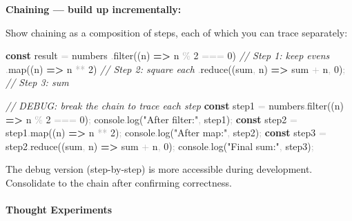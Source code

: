 \documentclass[
  justified,
  openright,
]{tufte-book}
\let\paragraph\paragraph
\newcommand{\KeywordTok}[1]{\textcolor{CodeKeyword}{\textbf{#1}}}  %
\newcommand{\StringTok}[1]{\textcolor{CodeString}{#1}}              %
\newcommand{\CommentTok}[1]{\textcolor{CodeComment}{\textit{#1}}}  %
\newcommand{\CodeNumTok}[1]{\textcolor{CodeNumber}{#1}}             %
\newcommand{\CodeFuncTok}[1]{\textcolor{CodeKeyword}{#1}}           %
\newcommand{\OperatorTok}[1]{\textcolor{DarkGray}{#1}}              %
\newenvironment{Shaded}{%
  \begin{mdframed}[style=TufteCode]%
}{%
  \end{mdframed}%
}
\let\paragraph\paragraph
\begin{document}
\textbf{Chaining --- build up incrementally:}

Show chaining as a composition of steps, each of which you can trace
separately:

\begin{Shaded}
\begin{Highlighting}[]
\KeywordTok{const} result \OperatorTok{=} numbers
  \OperatorTok{.}\CodeFuncTok{filter}((n) \KeywordTok{=\textgreater{}} n \OperatorTok{\%} \CodeNumTok{2} \OperatorTok{===} \CodeNumTok{0}) \CommentTok{// Step 1: keep evens}
  \OperatorTok{.}\CodeFuncTok{map}((n) \KeywordTok{=\textgreater{}} n \OperatorTok{**} \CodeNumTok{2}) \CommentTok{// Step 2: square each}
  \OperatorTok{.}\CodeFuncTok{reduce}((sum\OperatorTok{,} n) \KeywordTok{=\textgreater{}} sum \OperatorTok{+} n\OperatorTok{,} \CodeNumTok{0})\OperatorTok{;} \CommentTok{// Step 3: sum}
 
\CommentTok{// DEBUG: break the chain to trace each step}
\KeywordTok{const} step1 \OperatorTok{=} numbers\OperatorTok{.}\CodeFuncTok{filter}((n) \KeywordTok{=\textgreater{}} n \OperatorTok{\%} \CodeNumTok{2} \OperatorTok{===} \CodeNumTok{0})\OperatorTok{;}
console\OperatorTok{.}\CodeFuncTok{log}(\StringTok{"After filter:"}\OperatorTok{,} step1)\OperatorTok{;}
\KeywordTok{const} step2 \OperatorTok{=} step1\OperatorTok{.}\CodeFuncTok{map}((n) \KeywordTok{=\textgreater{}} n \OperatorTok{**} \CodeNumTok{2})\OperatorTok{;}
console\OperatorTok{.}\CodeFuncTok{log}(\StringTok{"After map:"}\OperatorTok{,} step2)\OperatorTok{;}
\KeywordTok{const} step3 \OperatorTok{=} step2\OperatorTok{.}\CodeFuncTok{reduce}((sum\OperatorTok{,} n) \KeywordTok{=\textgreater{}} sum \OperatorTok{+} n\OperatorTok{,} \CodeNumTok{0})\OperatorTok{;}
console\OperatorTok{.}\CodeFuncTok{log}(\StringTok{"Final sum:"}\OperatorTok{,} step3)\OperatorTok{;}
\end{Highlighting}
\end{Shaded}

The debug version (step-by-step) is more accessible during development.
Consolidate to the chain after confirming correctness.

\paragraph{Thought Experiments}\label{thought-experiments-22}
\end{document}
